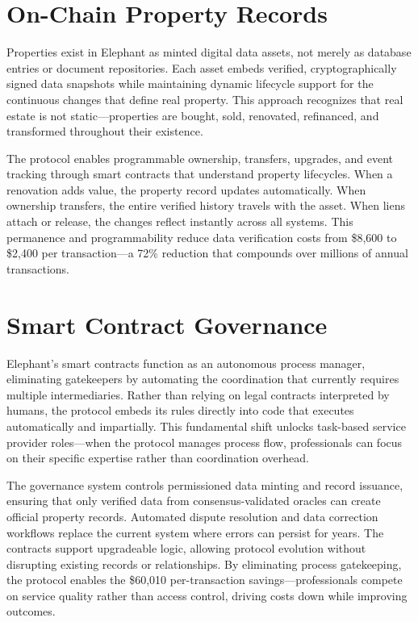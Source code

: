 \section{On-Chain Property Records}

Properties exist in Elephant as minted digital data assets, not merely as database entries or document repositories. Each asset embeds verified, cryptographically signed data snapshots while maintaining dynamic lifecycle support for the continuous changes that define real property. This approach recognizes that real estate is not static—properties are bought, sold, renovated, refinanced, and transformed throughout their existence.

The protocol enables programmable ownership, transfers, upgrades, and event tracking through smart contracts that understand property lifecycles. When a renovation adds value, the property record updates automatically. When ownership transfers, the entire verified history travels with the asset. When liens attach or release, the changes reflect instantly across all systems. This permanence and programmability reduce data verification costs from \$8,600 to \$2,400 per transaction—a 72\% reduction that compounds over millions of annual transactions.

\section{Smart Contract Governance}

Elephant's smart contracts function as an autonomous process manager, eliminating gatekeepers by automating the coordination that currently requires multiple intermediaries. Rather than relying on legal contracts interpreted by humans, the protocol embeds its rules directly into code that executes automatically and impartially. This fundamental shift unlocks task-based service provider roles—when the protocol manages process flow, professionals can focus on their specific expertise rather than coordination overhead.

The governance system controls permissioned data minting and record issuance, ensuring that only verified data from consensus-validated oracles can create official property records. Automated dispute resolution and data correction workflows replace the current system where errors can persist for years. The contracts support upgradeable logic, allowing protocol evolution without disrupting existing records or relationships. By eliminating process gatekeeping, the protocol enables the \$60,010 per-transaction savings—professionals compete on service quality rather than access control, driving costs down while improving outcomes.

